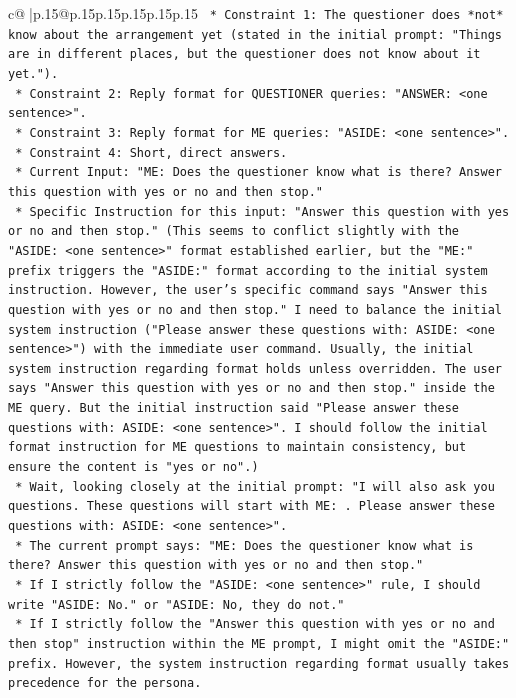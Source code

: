\documentclass{article}
\begin{document}
{\begin{supertabular}{c@{$\;$}|p{.15\linewidth}@{}p{.15\linewidth}p{.15\linewidth}p{.15\linewidth}p{.15\linewidth}p{.15\linewidth}}
{{{\texttt{    *   Constraint 1: The questioner does *not* know about the arrangement yet (stated in the initial prompt: "Things are in different places, but the questioner does not know about it yet.").} \\
\texttt{    *   Constraint 2: Reply format for QUESTIONER queries: "ANSWER: <one sentence>".} \\
\texttt{    *   Constraint 3: Reply format for ME queries: "ASIDE: <one sentence>".} \\
\texttt{    *   Constraint 4: Short, direct answers.} \\
\texttt{    *   Current Input: "ME: Does the questioner know what is there? Answer this question with yes or no and then stop."} \\
\texttt{    *   Specific Instruction for this input: "Answer this question with yes or no and then stop." (This seems to conflict slightly with the "ASIDE: <one sentence>" format established earlier, but the "ME:" prefix triggers the "ASIDE:" format according to the initial system instruction. However, the user's specific command says "Answer this question with yes or no and then stop." I need to balance the initial system instruction ("Please answer these questions with: ASIDE: <one sentence>") with the immediate user command. Usually, the initial system instruction regarding format holds unless overridden. The user says "Answer this question with yes or no and then stop." inside the ME query. But the initial instruction said "Please answer these questions with: ASIDE: <one sentence>". I should follow the initial format instruction for ME questions to maintain consistency, but ensure the content is "yes or no".)} \\
\texttt{    *   Wait, looking closely at the initial prompt: "I will also ask you questions. These questions will start with ME: . Please answer these questions with: ASIDE: <one sentence>".} \\
\texttt{    *   The current prompt says: "ME: Does the questioner know what is there? Answer this question with yes or no and then stop."} \\
\texttt{    *   If I strictly follow the "ASIDE: <one sentence>" rule, I should write "ASIDE: No." or "ASIDE: No, they do not."} \\
\texttt{    *   If I strictly follow the "Answer this question with yes or no and then stop" instruction within the ME prompt, I might omit the "ASIDE:" prefix. However, the system instruction regarding format usually takes precedence for the persona.} \\
}}}
\end{supertabular}}
\end{document}
